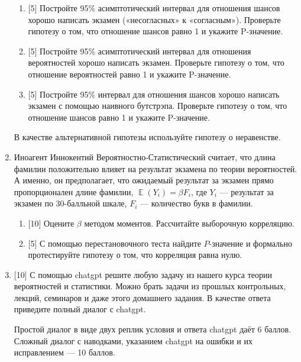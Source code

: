 \documentclass[12pt]{article} %
\DeclareMathOperator{\E}{\mathbb{E}}
\begin{document}
\begin{enumerate}
  \begin{enumerate}
    \item {[5]} Постройте 95\% асимптотический интервал для отношения шансов хорошо написать экзамен («несогласных» к «согласным»).
    Проверьте гипотезу о том, что отношение шансов равно 1 и укажите P-значение.
    \item {[5]} Постройте 95\% асимптотический интервал для отношения вероятностей хорошо написать экзамен. 
    Проверьте гипотезу о том, что отношение вероятностей равно 1 и укажите P-значение.
    \item {[5]} Постройте 95\% интервал для отношения шансов хорошо написать экзамен 
    с помощью наивного бутстрэпа. Проверьте гипотезу о том, что отношение шансов равно 1 и укажите P-значение.
  \end{enumerate}
  В качестве альтернативной гипотезы используйте гипотезу о неравенстве. 



    \item Иноагент Иннокентий Вероятностно-Статистический считает, что длина фамилии положительно влияет 
    на результат экзамена по теории вероятностей. 
    А именно, он предполагает, что ожидаемый результат за экзамен прямо пропорционален длине фамилии,
    $\E(Y_i) = \beta F_i$, где $Y_i$ — результат за экзамен по 30-балльной шкале, 
    $F_i$ — количество букв в фамилии. 

    \begin{enumerate}
      \item {[10]} Оцените $\beta$ методом моментов. Рассчитайте выборочную корреляцию.
      \item {[5]} С помощью перестановочного теста найдите $P$-значение и формально протестируйте гипотезу о том, что корреляция равна нулю.
    \end{enumerate}


    \item {[10]} С помощью chatgpt решите любую задачу из нашего курса теории вероятностей и статистики. 
    Можно брать задачи из прошлых контрольных, лекций, семинаров и даже этого домашнего задания.
    В качестве ответа приведите полный диалог с chatgpt. 
 
    Простой диалог в виде двух реплик условия и ответа chatgpt даёт 6 баллов. 
    Сложный диалог с наводками, указанием chatgpt на ошибки и их исправлением — 10 баллов. 
 

\end{enumerate}
\end{document}
